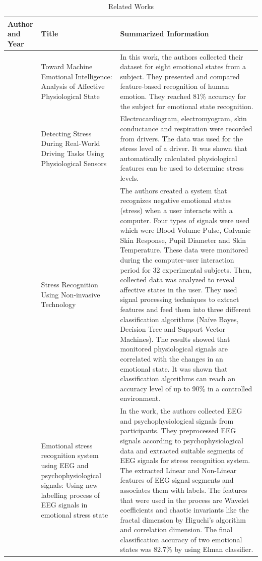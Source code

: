 \documentclass[12pt,oneandhalf,chaparabic,lfm,phd,eng,oneside,pntc]{gsufbe}
\begin{document}
\begin{longtable}[c]{| P{2cm} | P{3cm} | P{9cm} |}
\caption{Related Works}
\label{tab:Literature Review}\\
\hline
Author and Year & Title & Summarized Information \\ \hline
\endfirsthead
%
\endhead
%
\cite{picard2001toward} & Toward Machine Emotional Intelligence: Analysis of Affective Physiological State & In this work, the authors collected their dataset for eight emotional states from a subject. They presented and compared feature-based recognition of human emotion. They reached 81\% accuracy for the subject for emotional state recognition. \\ \hline
\cite{healey2005detecting} & Detecting Stress During Real-World Driving Tasks Using Physiological Sensors & Electrocardiogram, electromyogram, skin conductance and respiration were recorded from drivers. The data was used for the stress level of a driver. It was shown that automatically calculated physiological features can be used to determine stress levels. \\ \hline
\cite{zhai2006stress} & Stress Recognition Using Non-invasive Technology & The authors created a system that recognizes negative emotional states (stress) when a user interacts with a computer. Four types of signals were used which were Blood Volume Pulse, Galvanic Skin Response, Pupil Diameter and Skin Temperature. These data were monitored during the computer-user interaction period for 32 experimental subjects. Then, collected data was analyzed to reveal affective states in the user. They used signal processing techniques to extract features and feed them into three different classification algorithms (Naïve Bayes, Decision Tree and Support Vector Machines). The results showed that monitored physiological signals are correlated with the changes in an emotional state. It was shown that classification algorithms can reach an accuracy level of up to 90\% in a controlled environment. \\ \hline
\cite{hosseini2010emotional} & Emotional stress recognition system using EEG and psychophysiological signals: Using new labelling process of EEG signals in emotional stress state & In the work, the authors collected EEG and psychophysiological signals from participants. They preprocessed EEG signals according to psychophysiological data and extracted suitable segments of EEG signals for stress recognition system. The extracted Linear and Non-Linear features of EEG signal segments and associates them with labels. The features that were used in the process are Wavelet coefficients and chaotic invariants like the fractal dimension by Higuchi’s algorithm and correlation dimension. The final classification accuracy of two emotional states was 82.7\% by using Elman classifier. \\ \hline

\end{longtable}
\end{document}
